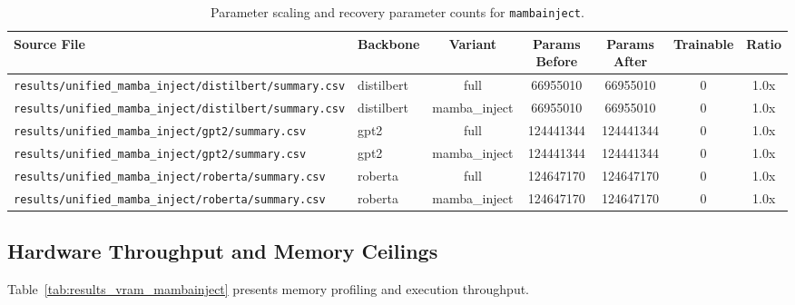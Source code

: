 \begin{table}[t]
\centering
\small
\begin{tabular}{llccccc}
\toprule
\textbf{Source File} & \textbf{Backbone} & \textbf{Variant} & \textbf{Params Before} & \textbf{Params After} & \textbf{Trainable} & \textbf{Ratio} \\
\midrule
\texttt{results/unified\_mamba\_inject/distilbert/summary.csv} & distilbert & full & 66955010 & 66955010 & 0 & 1.0x \\
\texttt{results/unified\_mamba\_inject/distilbert/summary.csv} & distilbert & mamba\_inject & 66955010 & 66955010 & 0 & 1.0x \\
\texttt{results/unified\_mamba\_inject/gpt2/summary.csv} & gpt2 & full & 124441344 & 124441344 & 0 & 1.0x \\
\texttt{results/unified\_mamba\_inject/gpt2/summary.csv} & gpt2 & mamba\_inject & 124441344 & 124441344 & 0 & 1.0x \\
\texttt{results/unified\_mamba\_inject/roberta/summary.csv} & roberta & full & 124647170 & 124647170 & 0 & 1.0x \\
\texttt{results/unified\_mamba\_inject/roberta/summary.csv} & roberta & mamba\_inject & 124647170 & 124647170 & 0 & 1.0x \\
\bottomrule
\end{tabular}
\caption{Parameter scaling and recovery parameter counts for \texttt{mambainject}.}
\label{tab:results_params_mambainject}
\end{table}

\subsection{Hardware Throughput and Memory Ceilings}
Table~\ref{tab:results_vram_mambainject} presents memory profiling and execution throughput.

